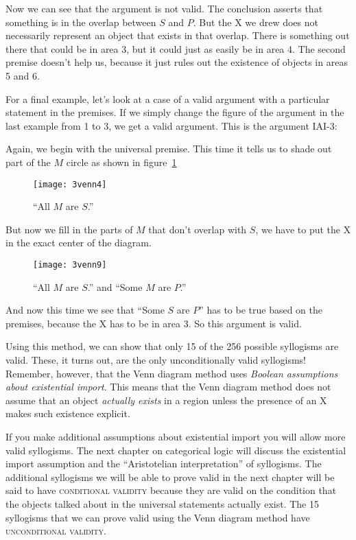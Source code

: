 Now we can see that the argument is not valid. The conclusion asserts that something is in the overlap between $S$ and $P$. But the X we drew does not necessarily represent an object that exists in that overlap. There is something out there that could be in area 3, but it could just as easily be in area 4. The second premise doesn't help us, because it just rules out the existence of objects in areas 5 and 6.

For a final example, let's look at a case of a valid argument with a particular statement in the premises. If we simply change the figure of the argument in the last example from 1 to 3, we get a valid argument. This is the argument IAI-3:

\begin{kormanize}
\end{kormanize}

Again, we begin with the universal premise. This time it tells us to shade out part of the $M$ circle as shown in figure~\ref{fig:vennallmares}

\begin{figure}[!ht]\centering
\texttt{[image: 3venn4]}
\caption{``All $M$ are $S$.''}
\label{fig:vennallmares}
\end{figure}

But now we fill in the parts of $M$ that don't overlap with $S$, we have to put the X in the exact center of the diagram.

\begin{figure}[!ht]\centering
\texttt{[image: 3venn9]}
\caption{``All $M$ are $S$.'' and ``Some $M$ are $P$.''}
\label{fig:vennvalidpart}
\end{figure}

And now this time we see that ``Some $S$ are $P$'' has to be true based on the premises, because the X has to be in area 3. So this argument is valid.

Using this method, we can show that only 15 of the 256 possible syllogisms are valid. These, it turns out, are the only unconditionally valid syllogisms! Remember, however, that the Venn diagram method uses \emph{Boolean assumptions about existential import}. This means that the Venn diagram method does not assume that an object \emph{actually exists} in a region unless the presence of an X makes such existence explicit.

If you make additional assumptions about existential import you will allow more valid syllogisms. The next chapter on categorical logic will discuss the existential import assumption and the ``Aristotelian interpretation'' of syllogisms. The additional syllogisms we will be able to prove valid in the next chapter will be said to have \textsc{\gls{conditional validity}} \label{def:Conditional_validity} because they are valid on the condition that the objects talked about in the universal statements actually exist. The 15 syllogisms that we can prove valid using the Venn diagram method have \textsc{\gls{unconditional validity}}. \label{def:Unconditional_validity}

